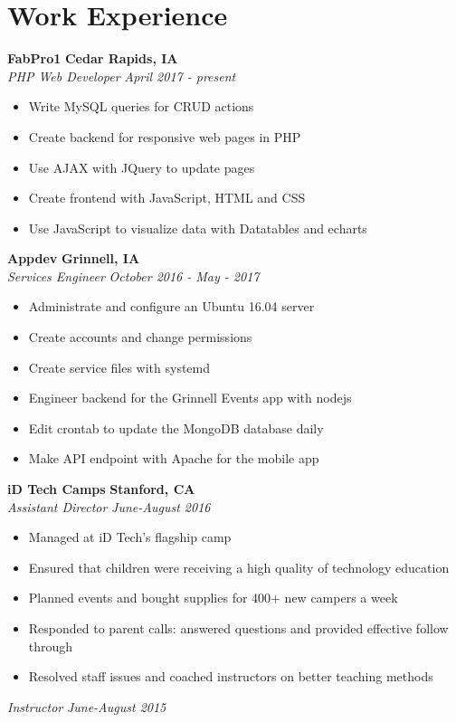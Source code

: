 \documentclass[10pt]{article}
\begin{document}
\section{Work Experience}
\textbf{FabPro1} \hfill \textbf{Cedar Rapids, IA}\\\emph{PHP Web Developer} \hfill \emph{April 2017 - present}
\begin{itemize}[noitemsep,nolistsep]
    \item Write MySQL queries for CRUD actions
    \item Create backend for responsive web pages in PHP
    \item Use AJAX with JQuery to update pages
    \item Create frontend with JavaScript, HTML and CSS
    \item Use JavaScript to visualize data with Datatables and echarts 
\end{itemize}
\textbf{Appdev} \hfill \textbf{Grinnell, IA}\\\emph{Services Engineer} \hfill \emph{October 2016 - May - 2017}
\begin{itemize}[noitemsep,nolistsep]
    \item Administrate and configure an Ubuntu 16.04 server 
    \item Create accounts and change permissions
    \item Create service files with systemd
    \item Engineer backend for the Grinnell Events app with nodejs 
    \item Edit crontab to update the MongoDB database daily 
    \item Make API endpoint with Apache for the mobile app
\end{itemize}
\textbf{iD Tech Camps} \hfill \textbf{Stanford, CA}\\\emph{Assistant Director} \hfill \emph{June-August 2016}
 \begin{itemize}[noitemsep,nolistsep] 
 \item Managed at iD Tech's flagship camp
 \item Ensured that children were receiving a high quality of technology education
 \item Planned events and bought supplies for 400+ new campers a week
 \item Responded to parent calls: answered questions and provided effective follow through
 \item Resolved staff issues and coached instructors on better teaching methods
 \end{itemize}
 \emph{Instructor} \hfill \emph{June-August 2015}
\end{document}
